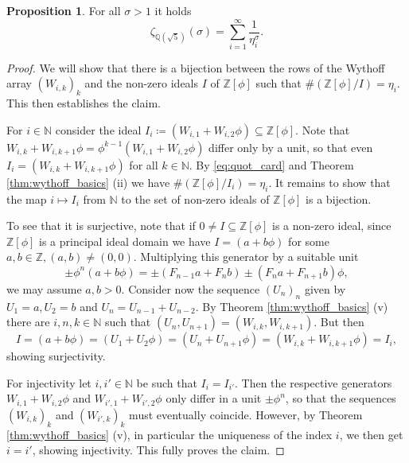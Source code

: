 \documentclass[]{interact}
\newcommand{\bbN}{\mathbb{N}}
\newcommand{\bbQ}{\mathbb{Q}}
\newcommand{\bbZ}{\mathbb{Z}}
\newcommand{\sbse}{\subseteq}
\theoremstyle{definition}
\newtheorem{prop}[thm]{Proposition}
\numberwithin{table}{section} %
\numberwithin{figure}{section}
\begin{document}
\begin{prop} \label{prop:Dedekind_eta}
    For all $\sigma > 1$ it holds
    $$
    \zeta_{\bbQ(\sqrt5)}(\sigma) = \sum_{i=1}^\infty \frac1{\eta_i^\sigma}.
    $$
\end{prop}
\begin{proof}
    We will show that there is a bijection between the rows of the Wythoff array $(W_{i, k})_k$ and the non-zero ideals $I$ of $\bbZ[\phi]$ such that $\#(\bbZ[\phi]/I) = \eta_i$. This then establishes the claim.

    For $i \in \bbN$ consider the ideal $I_i \coloneqq (W_{i, 1} + W_{i, 2}\phi) \sbse \bbZ[\phi]$. Note that $W_{i, k} + W_{i, k+1} \phi = \phi^{k-1} (W_{i, 1} + W_{i, 2}\phi)$ differ only by a unit, so that even $I_i = (W_{i, k} + W_{i, k+1} \phi)$ for all $k \in \bbN$. By \eqref{eq:quot_card} and Theorem \ref{thm:wythoff_basics} (ii) we have $\#(\bbZ[\phi]/I_i) = \eta_i$. It remains to show that the map $i \mapsto I_i$ from $\bbN$ to the set of non-zero ideals of $\bbZ[\phi]$ is a bijection.
    
    To see that it is surjective, note that if $0 \neq I \sbse \bbZ[\phi]$ is a non-zero ideal, since $\bbZ[\phi]$ is a principal ideal domain we have $I = (a+b\phi)$ for some $a, b \in \bbZ, (a, b) \neq (0, 0)$. Multiplying this generator by a suitable unit
    $$
    \pm \phi^n (a+b\phi) = \pm (F_{n-1}a+F_nb) \pm (F_na+F_{n+1}b)\phi,
    $$
    we may assume $a, b > 0$. Consider now the sequence $(U_n)_n$ given by $U_1 = a, U_2 = b$ and $U_n = U_{n-1} + U_{n-2}$. By Theorem \ref{thm:wythoff_basics} (v) there are $i, n, k \in \bbN$ such that $(U_n, U_{n+1}) = (W_{i, k}, W_{i, k+1})$. But then
    $$
    I = (a+b\phi) = (U_1+U_{2}\phi) = (U_n+U_{n+1}\phi) = (W_{i, k}+W_{i, k+1}\phi) = I_i,
    $$
    showing surjectivity.

    For injectivity let $i, i' \in \bbN$ be such that $I_i = I_{i'}$. Then the respective generators $W_{i, 1}+W_{i, 2}\phi$ and $W_{i', 1}+W_{i', 2}\phi$ only differ in a unit $\pm \phi^{n}$, so that the sequences $(W_{i, k})_k$ and $(W_{i', k})_k$ must eventually coincide. However, by Theorem \ref{thm:wythoff_basics} (v), in particular the uniqueness of the index $i$, we then get $i=i'$, showing injectivity. This fully proves the claim.
\end{proof}
\end{document}
